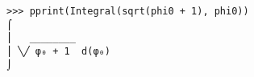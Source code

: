 \documentclass{article}
\begin{document}
\begin{verbatim}
>>> pprint(Integral(sqrt(phi0 + 1), phi0))
⌠
⎮   ________
⎮ ╲╱ φ₀ + 1  d(φ₀)
⌡
\end{verbatim}
\end{document}

